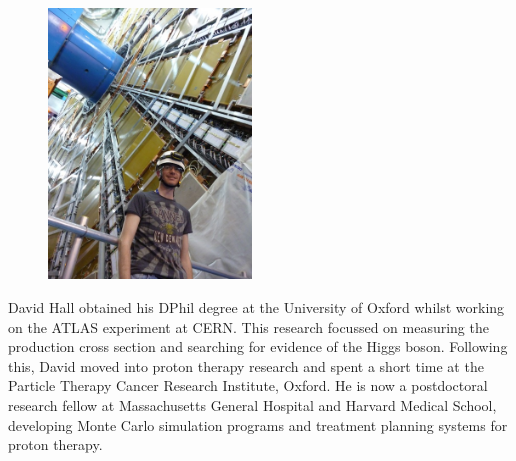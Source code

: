 
\begin{figure}
	\vspace{-20pt}
	\centering
	\includegraphics[width=0.48\textwidth]{tex/david_photo}
	\vspace{-20pt}
\end{figure}

David Hall obtained his DPhil degree at the University of Oxford whilst working on the ATLAS experiment at CERN. This research focussed on measuring the \WW production cross section and searching for evidence of the Higgs boson. Following this, David moved into proton therapy research and spent a short time at the Particle Therapy Cancer Research Institute, Oxford. He is now a postdoctoral research fellow at Massachusetts General Hospital and Harvard Medical School, developing Monte Carlo simulation programs and treatment planning systems for proton therapy. 

